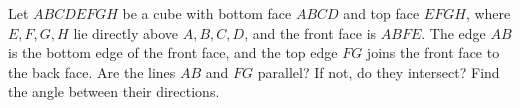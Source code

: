 Let $ABCDEFGH$ be a cube with bottom face $ABCD$ and top face $EFGH$, where $E,F,G,H$ lie directly above $A,B,C,D$, and the front face is $ABFE$. The edge $AB$ is the bottom edge of the front face, and the top edge $FG$ joins the front face to the back face. Are the lines $AB$ and $FG$ parallel? If not, do they intersect? Find the angle between their directions.
